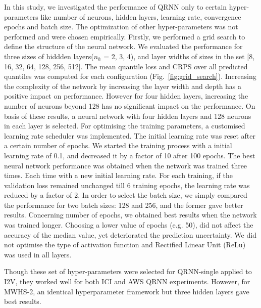 \documentclass[amt, manuscript]{copernicus}
\begin{document}
In this study, we investigated the performance of QRNN only to certain hyper-parameters like number of neurons, hidden layers, learning rate, convergence epochs and batch size. The optimization of other hyper-parameters was not performed and were chosen empirically. Firstly, we performed a grid search to define the structure of the neural network. We evaluated the performance for three sizes of hiddden layers($n_h$ = 2, 3, 4), and layer widths of sizes in the set [8, 16, 32, 64, 128, 256, 512]. The mean quantile loss and CRPS over all predicted quantiles was computed for each configuration (Fig.~\ref{fig:grid_search}). Increasing the complexity of the network by increasing the layer width and depth has a positive impact on performance. However for four hidden layers, increasing the number of neurons beyond 128 has no significant impact on the performance. On basis of these results, a neural network with four hidden layers and 128 neurons in each layer is selected. For optimising the training parameters, a customised  learning rate scheduler was implemented. The initial learning rate was reset after a certain number of epochs.  We started the training process with a initial learning rate of 0.1, and decreased it by a factor of 10 after 100 epochs. The best neural network performance was obtained when the network was trained three times. Each time with a new initial learning rate. For each training, if the validation loss remained unchanged till 6 training epochs, the learning rate was reduced by a factor of 2. 
In order to select the batch size, we simply compared the performance for two batch sizes: 128 and 256, and the former gave better results. Concerning number of epochs, we obtained best results when the network was trained longer. Choosing a lower value of epochs (e.g. 50), did not affect the accuracy of the median value, yet deteriorated the prediction uncertainty. We did not optimise the type of activation function and Rectified Linear Unit (ReLu) was used in all layers. 

Though these set of hyper-parameters were selected for QRNN-single applied to I2V, they worked well for both ICI and AWS QRNN experiments. However, for MWHS-2, an identical hyperparameter framework but three hidden layers gave best results.  



\noappendix       %
\end{document}
